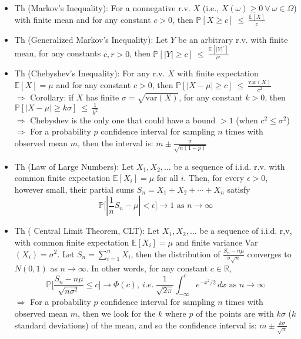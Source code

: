 \documentclass{article}
\begin{document}
{\color{blue} }
\begin{itemize}
	\item Th (Markov's Inequality): For a {\color{red} nonnegative} r.v. $X$ (i.e., $X(\omega)\geq 0\ \forall\ \omega\in\Omega$) with finite mean and for any constant $c>0$, then $\mathbb{P}[X\geq c]\ \leq\ \frac{\mathbb{E}[X]}{c}$
	\item Th (Generalized Markov's Inequality): Let $Y$ be an arbitrary r.v. with finite mean, for any constants $c,r>0$, then $\mathbb{P}[|Y|\geq c]\ \leq\ \frac{\mathbb{E}[|Y|^r]}{c^r}$
	\item Th (Chebyshev’s Inequality): For {\color{blue} any} r.v. $X$ with finite expectation $\mathbb{E}[X] = \mu$ and for any constant $c>0$, then $\mathbb{P}[|X-\mu|\geq c]\ \leq\ \frac{\text{var}(X)}{c^2}$ \\
	$\Longrightarrow$ Corollary: if $X$ has finite $\sigma = \sqrt{\text{var}(X)}$, for any constant $k>0$, then $\mathbb{P}[|X-\mu|\geq k\sigma]\ \leq\ \frac{1}{k^2}$ \\
	$\Longrightarrow$ Chebyshev is the only one that could have a bound $>1$ (when $c^2\leq \sigma^2$) \\
	$\Longrightarrow$ For a probability $p$ confidence interval for sampling $n$ times with observed mean $m$, then the interval is: $m\pm \frac{\sigma}{\sqrt{n(1-p)}}$

	\item Th (Law of Large Numbers): Let $X_1,X_2,\dots$ be a sequence of i.i.d. r.v. with common finite expectation $\mathbb{E}[X_i] = \mu$ for all $i$. Then, for every $\epsilon >0$, however small, their partial sums $S_n = X_1 + X_2 + \cdots + X_n$ satisfy
	$$\mathbb{P}\big[ |\frac{1}{n}S_n - \mu| < \epsilon \big] \longrightarrow 1
	\text{ as } n\longrightarrow \infty$$

	\item Th ({\color{red} Central Limit Theorem, CLT}): Let $X_1,X_2,\dots$ be a sequence of i.i.d. r,v, with common finite expectation $\mathbb{E}[X_i] = \mu$ and finite variance Var$(X_i) = \sigma^2$.
	Let $S_n = \sum\limits_{i=1}^{n} X_i$, then the distribution of $\frac{S_n - n\mu}{\sigma\sqrt{n}}$ converges to $N(0, 1)$ as $n\rightarrow\infty$. In other words, for any constant $c\in\mathbb{R}$,
	$$\mathbb{P}\Big[\frac{S_n - n\mu}{\sqrt{n\sigma^2}}\leq c\Big] \rightarrow
	\Phi(c),\ i.e.\
	\frac{1}{\sqrt{2\pi}} \int_{-\infty}^{c} e^{-x^2/2} \, dx \text{ as } n\rightarrow\infty$$
	$\Longrightarrow$ For a probability $p$ confidence interval for sampling $n$ times with observed mean $m$, then we look for the $k$ where $p$ of the points are with $k\sigma$ ($k$ standard deviations) of the mean, and so the confidence interval is: $m\pm \frac{k\sigma}{\sqrt{n}}$
	

\end{itemize}
\end{document}
